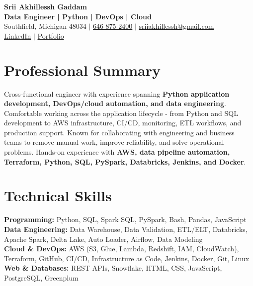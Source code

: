 \documentclass[letterpaper,10pt]{article}
\begin{document}
\fontsize{9.35pt}{10.45pt}\selectfont

\begin{center}
    {\LARGE \textbf{Srii Akhillessh Gaddam}} \\[-1pt]
    \textbf{Data Engineer | Python | DevOps | Cloud} \\[2pt]
    Southfield, Michigan 48034 $|$
    \href{tel:6468752400}{646-875-2400} $|$
    \href{mailto:sriiakhillessh@gmail.com}{sriiakhillessh@gmail.com} \\[1pt]
    \href{https://www.linkedin.com/in/srii-akhiilessh-gaddam-b48668191/}{LinkedIn} $|$
    \href{https://sriiakhillesshg.github.io/portfolio/}{Portfolio}
\end{center}
\vspace{-8pt}

\section{Professional Summary}
\small{Cross-functional engineer with experience spanning \textbf{Python application development, DevOps/cloud automation, and data engineering}. Comfortable working across the application lifecycle - from Python and SQL development to AWS infrastructure, CI/CD, monitoring, ETL workflows, and production support. Known for collaborating with engineering and business teams to remove manual work, improve reliability, and solve operational problems. Hands-on experience with \textbf{AWS, data pipeline automation, Terraform, Python, SQL, PySpark, Databricks, Jenkins, and Docker}.}

\section{Technical Skills}
\small{
\textbf{Programming:} Python, SQL, Spark SQL, PySpark, Bash, Pandas, JavaScript \\
\textbf{Data Engineering:} Data Warehouse, Data Validation, ETL/ELT, Databricks, Apache Spark, Delta Lake, Auto Loader, Airflow, Data Modeling \\
\textbf{Cloud \& DevOps:} AWS (S3, Glue, Lambda, Redshift, IAM, CloudWatch), Terraform, GitHub, CI/CD, Infrastructure as Code, Jenkins, Docker, Git, Linux \\
\textbf{Web \& Databases:} REST APIs, Snowflake, HTML, CSS, JavaScript, PostgreSQL, Greenplum
}
\end{document}
